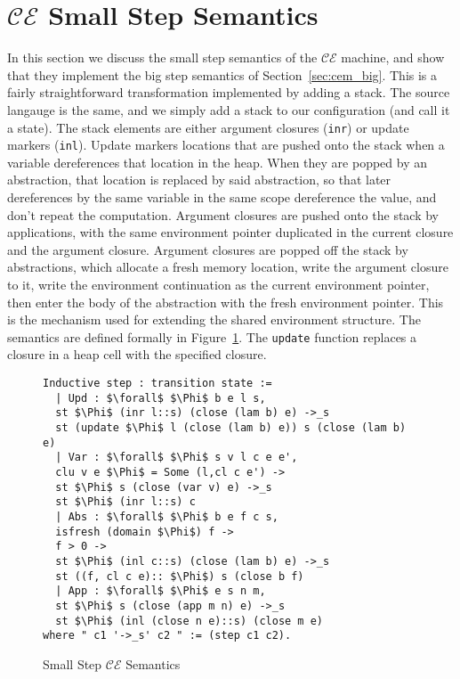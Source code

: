\section{$\mathcal{CE}$ Small Step Semantics} \label{sec:cem_small}

In this section we discuss the small step semantics of the $\mathcal{CE}$
machine, and show that they implement the big step semantics of
Section~\ref{sec:cem_big}. This is a fairly straightforward transformation implemented
by adding a stack. The source langauge is the same, and we simply add a stack to
our configuration (and call it a state). The stack elements are either argument
closures (\texttt{inr}) or update markers (\texttt{inl}). Update markers
locations that are pushed onto the stack when a variable dereferences that
location in the heap. When they are popped by an abstraction, that location is
replaced by said abstraction, so that later dereferences by the same variable in
the same scope dereference the value, and don't repeat the computation. Argument
closures are pushed onto the stack by applications, with the same environment
pointer duplicated in the current closure and the argument closure. Argument
closures are popped off the stack by abstractions, which allocate a fresh memory
location, write the argument closure to it, write the environment continuation
as the current environment pointer, then enter the body of the abstraction with
the fresh environment pointer. This is the mechanism used for extending the
shared environment structure. The semantics are defined formally in
Figure~\ref{fig:cesm}. The \texttt{update} function replaces a closure in a heap
cell with the specified closure.  

\begin{figure}
\begin{lstlisting}
Inductive step : transition state :=
  | Upd : $\forall$ $\Phi$ b e l s, 
  st $\Phi$ (inr l::s) (close (lam b) e) ->_s 
  st (update $\Phi$ l (close (lam b) e)) s (close (lam b) e)
  | Var : $\forall$ $\Phi$ s v l c e e', 
  clu v e $\Phi$ = Some (l,cl c e') -> 
  st $\Phi$ s (close (var v) e) ->_s 
  st $\Phi$ (inr l::s) c
  | Abs : $\forall$ $\Phi$ b e f c s, 
  isfresh (domain $\Phi$) f -> 
  f > 0 -> 
  st $\Phi$ (inl c::s) (close (lam b) e) ->_s 
  st ((f, cl c e):: $\Phi$) s (close b f)
  | App : $\forall$ $\Phi$ e s n m, 
  st $\Phi$ s (close (app m n) e) ->_s 
  st $\Phi$ (inl (close n e)::s) (close m e)
where " c1 '->_s' c2 " := (step c1 c2).
\end{lstlisting}
\caption{Small Step $\mathcal{CE}$ Semantics}
\label{fig:cesm}
\end{figure}

